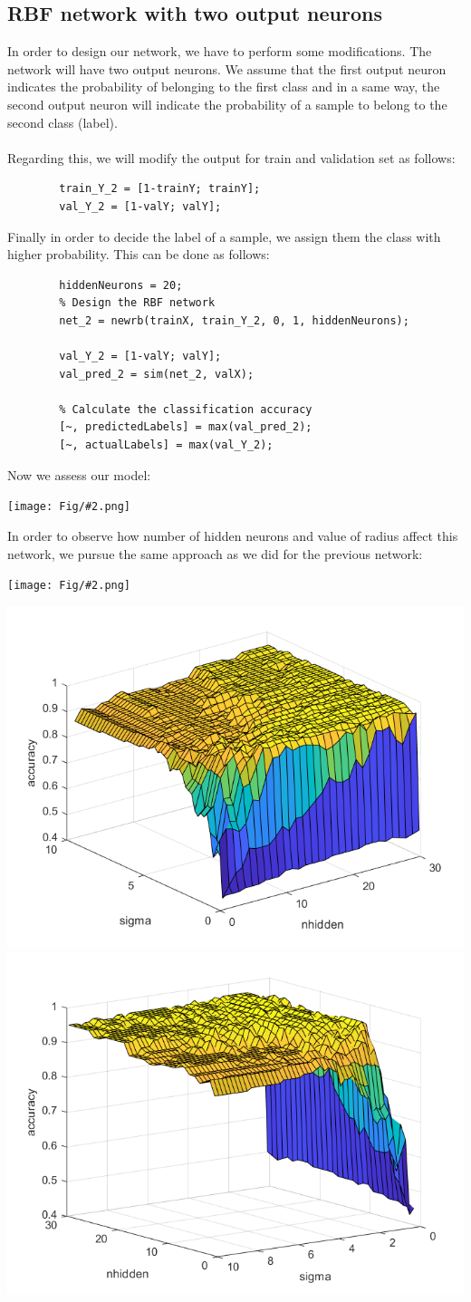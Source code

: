 \documentclass[]{article}
\newcommand{\pict}[2]{\begin{center}
		\texttt{[image: Fig/\#2.png]}
\end{center}}
\begin{document}
	\subsection{RBF network with two output neurons}
	In order to design our network, we have to perform some modifications. The network will have two output neurons. We assume that the first output neuron indicates the probability of belonging to the first class and in a same way, the second output neuron will indicate the probability of a sample to belong to the second class (label).\\\\
	Regarding this, we will modify the output for train and validation set as follows:
	\begin{lstlisting}
		train_Y_2 = [1-trainY; trainY];
		val_Y_2 = [1-valY; valY]; 
	\end{lstlisting}
	Finally in order to decide the label of a sample, we assign them the class with higher probability. This can be done as follows:
	\begin{lstlisting}
		hiddenNeurons = 20;
		% Design the RBF network
		net_2 = newrb(trainX, train_Y_2, 0, 1, hiddenNeurons);
		
		val_Y_2 = [1-valY; valY];
		val_pred_2 = sim(net_2, valX);
		
		% Calculate the classification accuracy
		[~, predictedLabels] = max(val_pred_2);
		[~, actualLabels] = max(val_Y_2);
	\end{lstlisting}
	Now we assess our model:
	\pict{0.7}{F6}
	In order to observe how number of hidden neurons and value of radius affect this network, we pursue the same approach as we did for the previous network:
	\pict{0.8}{F7}
	\begin{center}
		\includegraphics[width=0.4\linewidth]{Fig/F8.png}
		\qquad\qquad
		\includegraphics[width=0.4\linewidth]{Fig/F9.png}
	\end{center}
\end{document}
